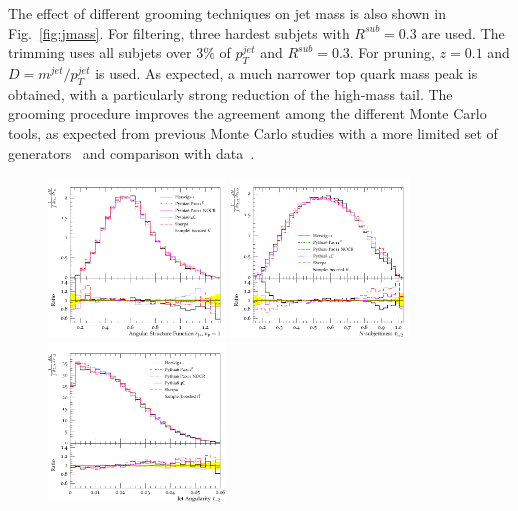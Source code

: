 The effect of different grooming techniques on jet mass is also shown in 
Fig.~\ref{fig:jmass}. For filtering, three hardest subjets with $R^{sub} =0.3$ are used.
The trimming uses all subjets over $3\%$ of $p_T^{jet}$ and $R^{sub} = 0.3$.
For pruning, $z = 0.1$ and $D = m^{jet} / p_T^{jet}$ is used.
As expected, a much narrower top quark mass peak 
is obtained, with a particularly strong reduction of the high-mass tail. 
The grooming procedure improves the agreement among the 
different Monte Carlo tools, as expected from previous Monte Carlo studies
with a more limited set of generators~\cite{Abdesselam:2010pt} and
comparison with data~\cite{ATLAS:2012am}. 
 




\begin{figure}[t!]
  \centering
\includegraphics[width=0.42\textwidth]{MC_SUBSTRUCTURE_1_peak_r.pdf}
\includegraphics[width=0.42\textwidth]{MC_SUBSTRUCTURE_Tau_32.pdf} \\
\includegraphics[width=0.42\textwidth]{MC_SUBSTRUCTURE_Angularity.pdf}

\end{figure}
